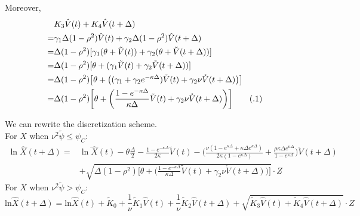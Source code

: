 \documentclass{ws-ijfe}
\newcommand\numberthis{\addtocounter{equation}{1}\tag{\theequation}}
\begin{document}
Moreover,
\begin{align*}
&K_3\hat{V}(t)+K_4\hat{V}(t+\Delta)\\
=&\gamma_1\Delta(1-\rho^2)\hat{V}(t)+\gamma_2\Delta(1-\rho^2)\hat{V}(t+\Delta)\\
=&\Delta(1-\rho^2)[\gamma_1(\theta+\tilde{V}(t))+\gamma_2(\theta+\tilde{V}(t+\Delta))]\\
=&\Delta(1-\rho^2)[\theta+(\gamma_1\tilde{V}(t)+\gamma_2\tilde{V}(t+\Delta))]\\
=&\Delta(1-\rho^2)\big[\theta+\big((\gamma_1+\gamma_2e^{-\kappa\Delta})\tilde{V}(t)+\gamma_2\nu \mathring{V}(t+\Delta)\big)\big]\\
=&\Delta(1-\rho^2)\bigg[\theta+\bigg(\frac{1-e^{-\kappa\Delta}}{\kappa\Delta}\tilde{V}(t)+\gamma_2\nu \mathring{V}(t+\Delta)\bigg)\bigg]\numberthis\label{QEK3K4}
\end{align*}

We can rewrite the discretization scheme.\\
For $X$ when $\nu^2\tilde{\psi} \leq \psi_C $:
\begin{equation}\label{newLnX}
\begin{split}
  \ln\hat{X}(t+\Delta)=&\ln\hat{X}(t)-\theta\frac{\Delta}{2}-\frac{1-e^{-\kappa\Delta}}{2\kappa}\tilde{V}(t)-\bigg(\frac{\nu(1-e^{\kappa\Delta}+\kappa\Delta e^{\kappa\Delta})}{2\kappa(1-e^{\kappa\Delta})}+\frac{\rho\kappa\Delta e^{\kappa\Delta}}{1-e^{\kappa\Delta}}\bigg)\mathring{V}(t+\Delta)\\
  &+\sqrt{\Delta(1-\rho^2)\bigg[\theta+\bigg(\frac{1-e^{-\kappa\Delta}}{\kappa\Delta}\tilde{V}(t)+\gamma_2\nu \mathring{V}(t+\Delta)\bigg)\bigg]}\cdot Z
\end{split}
\end{equation}
For $X$ when $\nu^2\tilde{\psi} > \psi_C $:
\begin{equation}\label{newLnX2}
  \text{ln}\hat{X}(t+\Delta)=\text{ln}\hat{X}(t)+\tilde{K}_0+\frac{1}{\nu}\tilde{K}_1\hat{V}(t)+\frac{1}{\nu}\tilde{K}_2\hat{V}(t+\Delta)+\sqrt{\tilde{K}_3\hat{V}(t)+\tilde{K}_4\hat{V}(t+\Delta)}\cdot Z
\end{equation}
\end{document}
